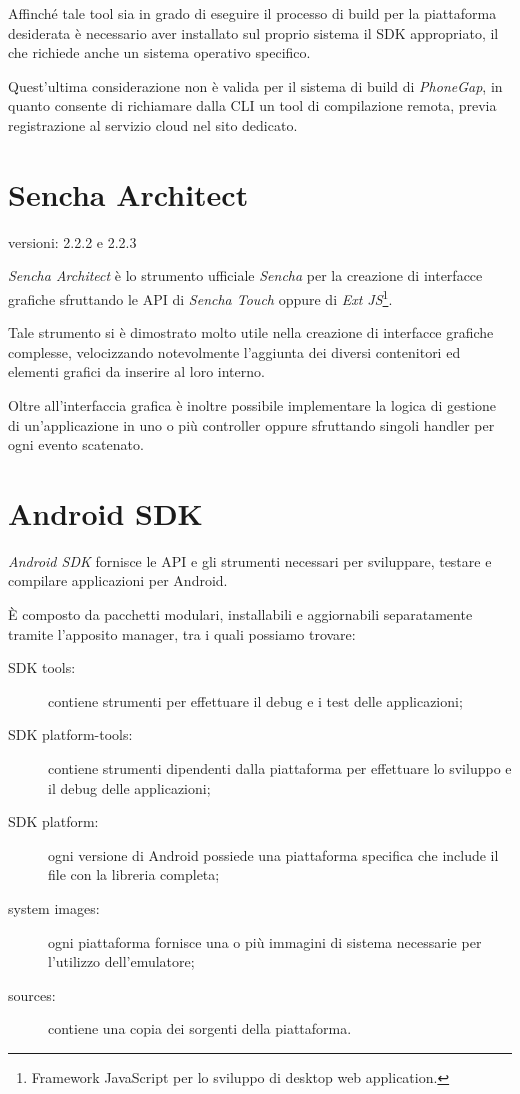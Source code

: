 Affinché tale tool sia in grado di eseguire il processo di build per la piattaforma desiderata è necessario aver installato sul proprio sistema il \ac{SDK} appropriato, il che richiede anche un sistema operativo specifico.

Quest'ultima considerazione non è valida per il sistema di build di \emph{PhoneGap}, in quanto consente di richiamare dalla \ac{CLI} un tool di compilazione remota, previa registrazione al servizio cloud nel sito dedicato.

\section{Sencha Architect}
\begin{description}
\item[versioni: 2.2.2 e 2.2.3]
\end{description}

\emph{Sencha Architect} è lo strumento ufficiale \emph{Sencha} per la creazione di interfacce grafiche sfruttando le \ac{API} di \emph{Sencha Touch} oppure di \emph{Ext JS}\footnote{Framework JavaScript per lo  sviluppo di desktop web application.}.

Tale strumento si è dimostrato molto utile nella creazione di interfacce grafiche complesse, velocizzando notevolmente l'aggiunta dei diversi contenitori ed elementi grafici da inserire al loro interno.

Oltre all'interfaccia grafica è inoltre possibile implementare la logica di gestione di un'applicazione in uno o più controller oppure sfruttando singoli handler per ogni evento scatenato.

\section{Android SDK}
\emph{Android \ac{SDK}} fornisce le \ac{API} e gli strumenti necessari per sviluppare, testare e compilare applicazioni per Android.

È composto da pacchetti modulari, installabili e aggiornabili separatamente tramite l'apposito manager, tra i quali possiamo trovare:
\begin{description}
\item[SDK tools:] contiene strumenti per effettuare il debug e i test delle applicazioni;
\item[SDK platform-tools:] contiene strumenti dipendenti dalla piattaforma per effettuare lo sviluppo e il debug delle applicazioni;
\item[SDK platform:] ogni versione di Android possiede una piattaforma specifica che include il file  con la libreria completa;
\item[system images:] ogni piattaforma fornisce una o più immagini di sistema necessarie per l'utilizzo dell'emulatore;
\item[sources:] contiene una copia dei sorgenti della piattaforma.
\end{description}

